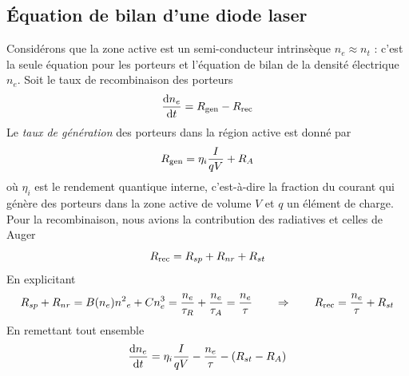 	\subsection{Équation de bilan d'une diode laser}
	Considérons que la zone active est un semi-conducteur intrinsèque $n_e\approx n_t$ : c'est la
	seule équation pour les porteurs et l'équation de bilan de la densité électrique $n_e$. 
	Soit le taux de recombinaison des porteurs
	\begin{equation}
	\frac{{{\rm{d}}{n_e}}}{{{\rm{d}}t}} = {R_{{\rm{gen}}}} - {R_{{\rm{rec}}}}
	\end{equation}
	Le \textit{taux de génération} des porteurs dans la région active est donné par
	\begin{equation}
	{R_{{\rm{gen}}}} = {\eta _i}\frac{{I}}{{qV}} + {R_A}
	\end{equation}
	où $\eta_i$ est le rendement quantique interne, c'est-à-dire la fraction du courant qui génère
	des porteurs dans la zone active de volume $V$ et $q$ un élément de charge. Pour la recombinaison,
	nous avions la contribution des radiatives et celles de Auger
	\begin{equation}
	{R_{{\rm{rec}}}} = {R_{sp}} + {R_{nr}} + {R_{st}}
	\end{equation}
	En explicitant
	\begin{equation}
	{R_{sp}} + {R_{nr}} = B({n_e}){n^2}_e + Cn_e^3 = \frac{{{n_e}}}{{{\tau _R}}} + \frac{{{n_e}}}
	{{{\tau _A}}} = \frac{{{n_e}}}{\tau }\qquad\Rightarrow\qquad
	{R_{{\rm{rec}}}} = \frac{{{n_e}}}{\tau } + {R_{st}}
	\end{equation}
	En remettant tout ensemble
	\begin{equation}
	\frac{{{\rm{d}}{n_e}}}{{{\rm{d}}t}} = {\eta _i}\frac{{I}}{{qV}} - \frac{{{n_e}}}{\tau } -
	({R_{st}} - {R_A})
	\end{equation}		
	
